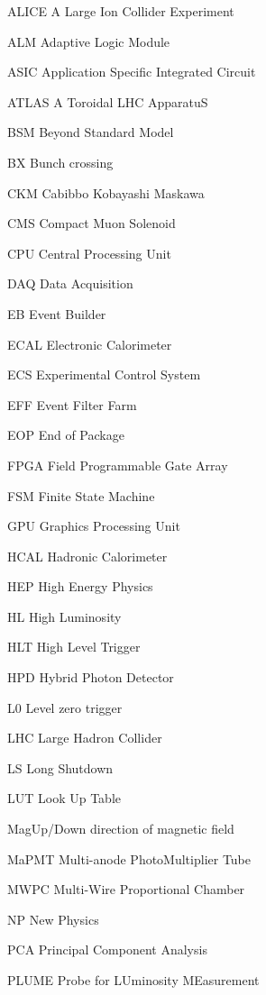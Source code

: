 \begin{abbreviations}
    \item[ALICE] A Large Ion Collider Experiment
    \item[ALM] Adaptive Logic Module
    \item[ASIC] Application Specific Integrated Circuit
    \item[ATLAS] A Toroidal LHC ApparatuS
    \item[BSM] Beyond Standard Model
    \item[BX] Bunch crossing
    \item[CKM] Cabibbo Kobayashi Maskawa
    \item[CMS] Compact Muon Solenoid
    \item[CPU] Central Processing Unit
    \item[DAQ] Data Acquisition
    \item[EB] Event Builder
    \item[ECAL] Electronic Calorimeter
    \item[ECS] Experimental Control System
    \item[EFF] Event Filter Farm
    \item[EOP] End of Package
    \item[FPGA] Field Programmable Gate Array
    \item[FSM] Finite State Machine
    \item[GPU] Graphics Processing Unit
    \item[HCAL] Hadronic Calorimeter
    \item[HEP] High Energy Physics
    \item[HL] High Luminosity
    \item[HLT] High Level Trigger
    \item[HPD] Hybrid Photon Detector
    \item[L0] Level zero trigger
    \item[LHC] Large Hadron Collider
    \item[LS] Long Shutdown
    \item[LUT] Look Up Table
    \item[MagUp/Down] direction of magnetic field
    \item[MaPMT] Multi-anode PhotoMultiplier Tube
    \item[MWPC] Multi-Wire Proportional Chamber
    \item[NP] New Physics
    \item[PCA] Principal Component Analysis
    \item[PLUME] Probe for LUminosity MEasurement

\end{abbreviations}
